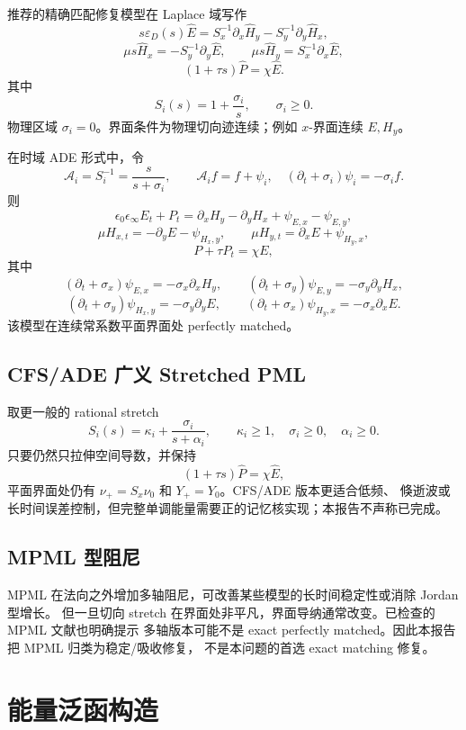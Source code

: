 \documentclass[UTF8,a4paper,11pt]{ctexart}
\newcommand{\eps}{\varepsilon}
\begin{document}
推荐的精确匹配修复模型在 Laplace 域写作
\[
\boxed{
s\eps_D(s)\widehat E
=S_x^{-1}\partial_x\widehat H_y
-S_y^{-1}\partial_y\widehat H_x,}
\]
\[
\boxed{
\mu s\widehat H_x=-S_y^{-1}\partial_y\widehat E,\qquad
\mu s\widehat H_y=S_x^{-1}\partial_x\widehat E,}
\]
\[
\boxed{(1+\tau s)\widehat P=\chi\widehat E.}
\]
其中
\[
S_i(s)=1+\frac{\sigma_i}{s},\qquad \sigma_i\ge0.
\]
物理区域 \(\sigma_i=0\)。界面条件为物理切向迹连续；例如 \(x\)-界面连续 \(E,H_y\)。

在时域 ADE 形式中，令
\[
\mathcal A_i=S_i^{-1}=\frac{s}{s+\sigma_i},
\qquad
\mathcal A_i f=f+\psi_i,\quad
(\partial_t+\sigma_i)\psi_i=-\sigma_i f.
\]
则
\[
\epsilon_0\epsilon_\infty E_t+P_t
=\partial_xH_y-\partial_yH_x+\psi_{E,x}-\psi_{E,y},
\]
\[
\mu H_{x,t}=-\partial_yE-\psi_{H_x,y},\qquad
\mu H_{y,t}=\partial_xE+\psi_{H_y,x},
\]
\[
P+\tau P_t=\chi E,
\]
其中
\[
(\partial_t+\sigma_x)\psi_{E,x}=-\sigma_x\partial_xH_y,\qquad
(\partial_t+\sigma_y)\psi_{E,y}=-\sigma_y\partial_yH_x,
\]
\[
(\partial_t+\sigma_y)\psi_{H_x,y}=-\sigma_y\partial_yE,\qquad
(\partial_t+\sigma_x)\psi_{H_y,x}=-\sigma_x\partial_xE.
\]
该模型在连续常系数平面界面处 perfectly matched。

\subsection{CFS/ADE 广义 Stretched PML}

取更一般的 rational stretch
\[
S_i(s)=\kappa_i+\frac{\sigma_i}{s+\alpha_i},\qquad
\kappa_i\ge1,\quad \sigma_i\ge0,\quad \alpha_i\ge0.
\]
只要仍然只拉伸空间导数，并保持
\[
(1+\tau s)\widehat P=\chi\widehat E,
\]
平面界面处仍有 \(\nu_+=S_x\nu_0\) 和 \(Y_+=Y_0\)。CFS/ADE 版本更适合低频、
倏逝波或长时间误差控制，但完整单调能量需要正的记忆核实现；本报告不声称已完成。

\subsection{MPML 型阻尼}

MPML 在法向之外增加多轴阻尼，可改善某些模型的长时间稳定性或消除 Jordan 型增长。
但一旦切向 stretch 在界面处非平凡，界面导纳通常改变。已检查的 MPML 文献也明确提示
多轴版本可能不是 exact perfectly matched。因此本报告把 MPML 归类为稳定/吸收修复，
不是本问题的首选 exact matching 修复。

\section{能量泛函构造}
\end{document}
